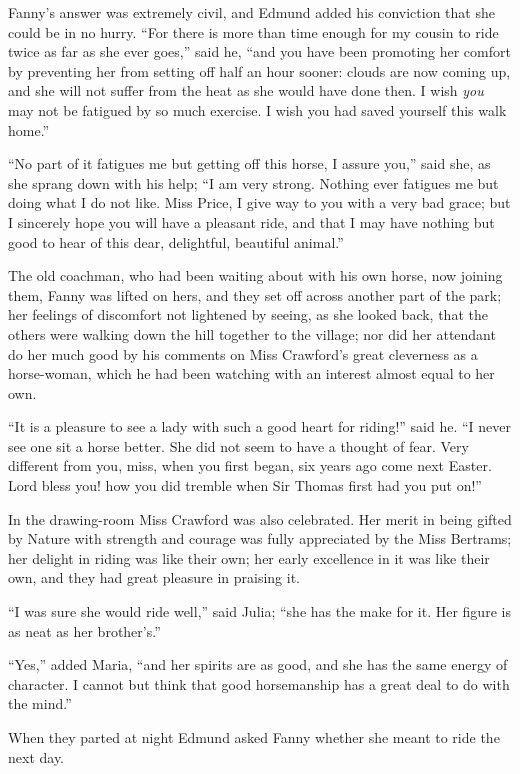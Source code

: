 \documentclass{article}
\begin{document}
Fanny's answer was extremely civil, and Edmund added
his conviction that she could be in no hurry.  ``For there
is more than time enough for my cousin to ride twice
as far as she ever goes,'' said he, ``and you have been
promoting her comfort by preventing her from setting off
half an hour sooner:  clouds are now coming up, and she
will not suffer from the heat as she would have done then.
I wish \emph{you} may not be fatigued by so much exercise.
I wish you had saved yourself this walk home.''

``No part of it fatigues me but getting off this horse,
I assure you,'' said she, as she sprang down with his help;
``I am very strong.  Nothing ever fatigues me but doing
what I do not like.  Miss Price, I give way to you with
a very bad grace; but I sincerely hope you will have
a pleasant ride, and that I may have nothing but good
to hear of this dear, delightful, beautiful animal.''

The old coachman, who had been waiting about with his
own horse, now joining them, Fanny was lifted on hers,
and they set off across another part of the park;
her feelings of discomfort not lightened by seeing,
as she looked back, that the others were walking down
the hill together to the village; nor did her attendant
do her much good by his comments on Miss Crawford's great
cleverness as a horse-woman, which he had been watching
with an interest almost equal to her own.

``It is a pleasure to see a lady with such a good heart
for riding!'' said he.  ``I never see one sit a horse better.
She did not seem to have a thought of fear.  Very different
from you, miss, when you first began, six years ago come
next Easter.  Lord bless you! how you did tremble when Sir
Thomas first had you put on!''

In the drawing-room Miss Crawford was also celebrated.
Her merit in being gifted by Nature with strength
and courage was fully appreciated by the Miss Bertrams;
her delight in riding was like their own; her early
excellence in it was like their own, and they had great
pleasure in praising it.

``I was sure she would ride well,'' said Julia; ``she has
the make for it.  Her figure is as neat as her brother's.''

``Yes,'' added Maria, ``and her spirits are as good, and she
has the same energy of character.  I cannot but think
that good horsemanship has a great deal to do with the mind.''

When they parted at night Edmund asked Fanny whether she
meant to ride the next day.
\end{document}
